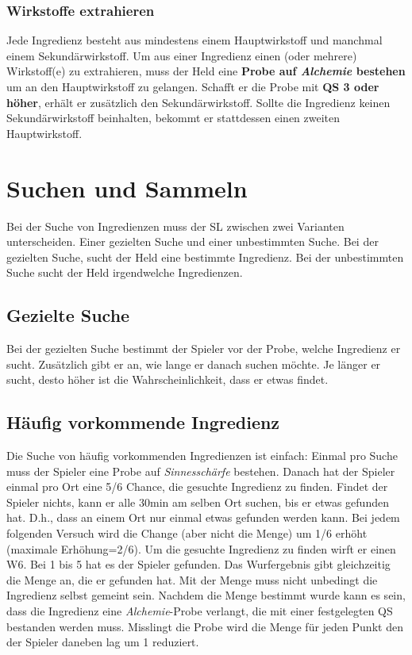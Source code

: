 \subsubsection{Wirkstoffe extrahieren}
\label{chap:wirkstoffgewinnung}
Jede Ingredienz besteht aus mindestens einem Hauptwirkstoff und manchmal einem Sekundärwirkstoff. Um aus einer Ingredienz einen (oder mehrere) Wirkstoff(e) zu extrahieren, muss der Held eine \textbf{Probe auf \textit{Alchemie} bestehen} um an den Hauptwirkstoff zu gelangen. Schafft er die Probe mit \textbf{QS 3 oder höher}, erhält er zusätzlich den Sekundärwirkstoff. Sollte die Ingredienz keinen Sekundärwirkstoff beinhalten, bekommt er stattdessen einen zweiten Hauptwirkstoff. 


\section{Suchen und Sammeln}
Bei der Suche von Ingredienzen muss der SL zwischen zwei Varianten unterscheiden. Einer gezielten Suche und einer unbestimmten Suche. Bei der gezielten Suche, sucht der Held eine bestimmte Ingredienz. Bei der unbestimmten Suche sucht der Held irgendwelche Ingredienzen.

\subsection{Gezielte Suche}
Bei der gezielten Suche bestimmt der Spieler vor der Probe, welche Ingredienz er sucht. Zusätzlich gibt er an, wie lange er danach suchen möchte. Je länger er sucht, desto höher ist die Wahrscheinlichkeit, dass er etwas findet. 

\subsection{Häufig vorkommende Ingredienz}
Die Suche von häufig vorkommenden Ingredienzen ist einfach: Einmal pro Suche muss der Spieler eine Probe auf \textit{Sinnesschärfe} bestehen. Danach hat der Spieler einmal pro Ort eine 5/6 Chance, die gesuchte Ingredienz zu finden. Findet der Spieler nichts, kann er alle 30min am selben Ort suchen, bis er etwas gefunden hat. D.h., dass an einem Ort nur einmal etwas gefunden werden kann. Bei jedem folgenden Versuch wird die Change (aber nicht die Menge) um 1/6 erhöht (maximale Erhöhung=2/6). Um die gesuchte Ingredienz zu finden wirft er einen W6. Bei 1 bis 5 hat es der Spieler gefunden. Das Wurfergebnis gibt gleichzeitig die Menge an, die er gefunden hat. Mit der Menge muss nicht unbedingt die Ingredienz selbst gemeint sein. Nachdem die Menge bestimmt wurde kann es sein, dass die Ingredienz eine \textit{Alchemie}-Probe verlangt, die mit einer festgelegten QS bestanden werden muss. Misslingt die Probe wird die Menge für jeden Punkt den der Spieler daneben lag um 1 reduziert.

